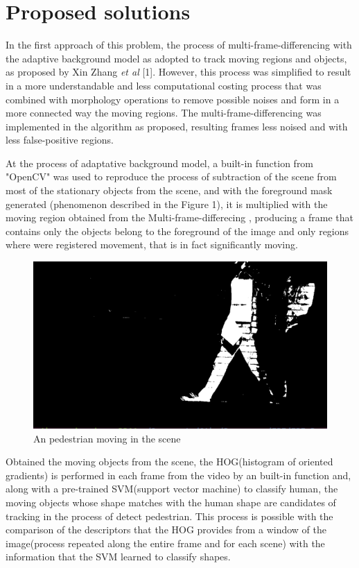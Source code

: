 \documentclass[conference]{IEEEtran}
\begin{document}
\section{Proposed solutions}

	In the first approach of this problem, the process of multi-frame-differencing with the adaptive background model as adopted to track moving regions and objects, as proposed by Xin Zhang \textit{et al} [1]. However, this process was simplified to result in a more understandable and less computational costing process that was combined with morphology operations to remove possible noises and form in a more connected way the moving regions. The multi-frame-differencing was implemented in the algorithm as proposed, resulting frames less noised and with less false-positive regions.
	
	At the process of adaptative background model, a built-in function from "OpenCV" was used to reproduce the process of subtraction of the scene from most of the stationary objects from the scene, and with the foreground mask generated (phenomenon described in the Figure 1), it is multiplied with the moving region obtained from the Multi-frame-differecing , producing a frame that contains only the objects belong to the foreground of the image and only regions where were registered movement, that is in fact significantly moving.

	\begin{figure}[htbp]
	\centerline{\includegraphics[scale=0.5]{background_sub.png}}
	\caption{An pedestrian moving in the scene}
	\label{fig}
	\end{figure}
	
	Obtained the moving objects from the scene, the HOG(histogram of oriented gradients) is performed in each frame from the video by an built-in function and, along with a pre-trained SVM(support vector machine) to classify human, the moving objects whose shape matches with the human shape are candidates of tracking in the process of detect pedestrian. This process is possible with the comparison of the descriptors that the HOG provides from a window of the image(process repeated along the entire frame and for each scene) with the information that the SVM learned to classify shapes.	
	
\end{document}
